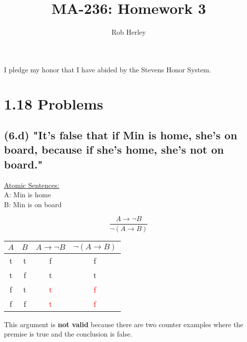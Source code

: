 \documentclass[12pt]{article}
\newcommand{\red}[1]{\textcolor{red}{#1}}
\begin{document}
\title{MA-236: Homework 3}
\author{Rob Herley}
\maketitle

\begin{center}
I pledge my honor that I have abided by the Stevens Honor System.
\end{center}

\section*{1.18 Problems}
\subsection*{(6.d) "It's false that if Min is home, she's on board, because if she's home, she's not on board."}

\begin{center}
\underline{Atomic Sentences:} \\
A: Min is home \\
B: Min is on board \\
\end{center}

$$ \frac{A\rightarrow \neg B}{\neg (A \rightarrow B)}$$

\begin{center}
\begin{tabular}{cc|cc}
$A$ & $B$ & $A\rightarrow \neg B$ & $\neg (A \rightarrow B)$  \\ \hline
t & t & f       &   f   \\
t & f & t       &   t   \\
f & t & \red{t} &   \red{f}   \\
f & f & \red{t} &   \red{f}       
\end{tabular}
\end{center}

\noindent
This argument is \textbf{not valid} because there are two counter examples where the
premise is true and the conclusion is false.
\end{document}
